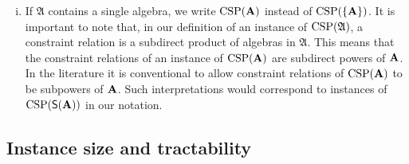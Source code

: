 \begin{remark}
\begin{enumerate}[(i)]

\item If $\mathfrak A$ contains a single algebra, we write $\operatorname{CSP}(\mathbf{A})$
    instead of $\operatorname{CSP}(\{\mathbf{A}\})$.  It is important to note that, in our definition of an
    instance of $\operatorname{CSP}(\mathfrak A)$, a constraint relation is a subdirect product of
    algebras in $\mathfrak A$. This means that the constraint relations of an
    instance of $\operatorname{CSP}(\mathbf{A})$ are subdirect powers of $\mathbf{A}$.
    In the literature it is conventional to allow constraint relations
    of $\operatorname{CSP}(\mathbf{A})$ to be subpowers of $\mathbf{A}$. 
    Such interpretations would correspond to instances of
    $\operatorname{CSP}(\mathsf{S} (\mathbf{A}))$  in our notation.
  \end{enumerate}
\end{remark}


\subsection{Instance size and tractability}
\label{sec:inst-size-tract}

